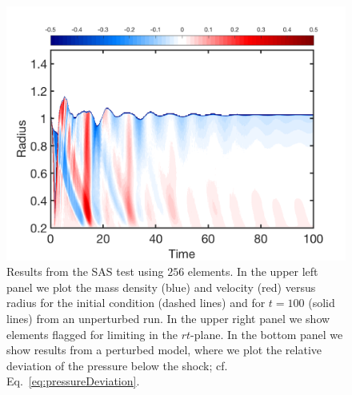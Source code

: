 \documentclass[letterpaper]{jpconf}
\begin{document}
\begin{figure}[h]
\begin{minipage}{36pc}
    \includegraphics[width=36pc]{./Figures/SAS_Perturbed_Astronum_2018}
  \end{minipage}
  \caption{\label{fig:SAS}Results from the SAS test using $256$ elements.  In the upper left panel we plot the mass density (blue) and velocity (red) versus radius for the initial condition (dashed lines) and for $t=100$ (solid lines) from an unperturbed run.  In the upper right panel we show elements flagged for limiting in the $rt$-plane.  In the bottom panel we show results from a perturbed model, where we plot the relative deviation of the pressure below the shock; cf. Eq.~\eqref{eq:pressureDeviation}.}
\end{figure}
\end{document}
